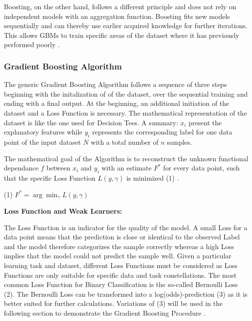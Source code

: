 Boosting, on the other hand, follows a different principle and does not rely on independent 
models with an aggregation function. Boosting fits new models sequentially and can thereby use 
earlier acquired knowledge for further iterations. This allows GBMs to train specific areas of 
the dataset where it has previously performed poorly \cite[p.345f]{James2021}.  

\subsubsection{Gradient Boosting Algorithm}

The generic Gradient Boosting Algorithm follows a sequence of three steps beginning with the initalization of
of the dataset, over the sequential training and ending with a final output. At the beginning, an 
additional initiation of the dataset and a Loss Function is necessary. The mathematical 
representation of the dataset is like the one used for Decision Tees. A summary: \(x_{i}\) present the 
explanatory features while \(y_{i}\) represents the corresponding label for one data point of the input 
dataset \(N\) with a total number of \(n\) samples. 

The mathematical goal of the Algorithm is to reconstruct the unknown functional dependance \(f\) 
between \(x_{i}\) and \(y_{i}\) with an estimate \(F^{*}\) for every data point, such that the specific Loss 
Function \(L(y, \gamma)\) is minimized (1) \cite[p.1189]{Friedman_2001} \cite[2.1]{Natekin2013}. 

(1) \(F^{*} = \arg \min_{\gamma} L(y,\gamma)\)

\textbf{Loss Function and Weak Learners:}

The Loss Function is an indicator for the quality of the model. A small Loss for a data point 
means that the prediction is close or identical to the observed Label and the model therefore 
categorizes the sample correctly whereas a high Loss implies that the model could not predict 
the sample well. Given a particular learning task and dataset, different Loss Functions must 
be considered as Loss Functions are only suitable for specific data and task constellations. The most common 
Loss Function for Binary Classification is the so-called Bernoulli Loss (2). The Bernoulli Loss 
can be transformed into a log(odds)-prediction (3) as it is better suited for further calculations. 
Variations of (3) will be used in the following section to demonstrate the Gradient Boosting 
Procedure \cite[3.1]{Natekin2013}. 

